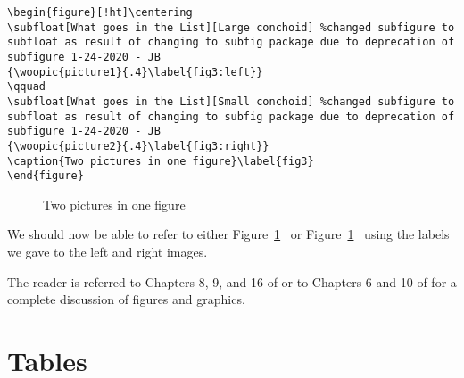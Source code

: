 \begin{singlespace}\small
\begin{verbatim}
\begin{figure}[!ht]\centering
\subfloat[What goes in the List][Large conchoid] %changed subfigure to subfloat as result of changing to subfig package due to deprecation of subfigure 1-24-2020 - JB
{\woopic{picture1}{.4}\label{fig3:left}}
\qquad
\subfloat[What goes in the List][Small conchoid] %changed subfigure to subfloat as result of changing to subfig package due to deprecation of subfigure 1-24-2020 - JB
{\woopic{picture2}{.4}\label{fig3:right}}
\caption{Two pictures in one figure}\label{fig3}
\end{figure}
\end{verbatim}
\end{singlespace}
\begin{figure}[!ht]\centering
{}
\qquad
{}
\caption{Two pictures in one figure}\label{fig3}
\end{figure}

We should now be able to refer to either Figure~\ref{fig3}~ or Figure~\ref{fig3}~ using the labels we gave to the left and right images.

The reader is referred to Chapters 8, 9, and 16 of \citet{kd03} or to Chapters 6 and 10 of \citet{mgbcr04} for a complete discussion of figures and graphics.

\section{Tables}

